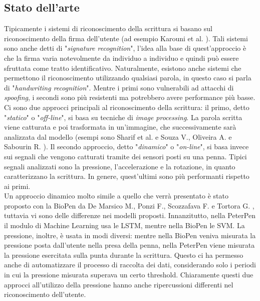 \documentclass[8pt,notitlepage]{report}
\begin{document}
\subsection*{Stato dell'arte}
	Tipicamente i sistemi di riconoscimento della scrittura si basano sul riconoscimento della firma dell'utente (ad esempio Karouni et al. \cite{Karouni15}). Tali sistemi sono anche detti di "\textit{signature recognition}", l'idea alla base di quest'approccio è che la firma varia notevolmente da individuo a individuo e quindi può essere sfruttata come tratto identificativo. Naturalmente, esistono anche sistemi che permettono il riconoscimento utilizzando qualsiasi parola, in questo caso si parla di "\textit{handwriting recognition}". Mentre i primi sono vulnerabili ad attacchi di \textit{spoofing}, i secondi sono più resistenti ma potrebbero avere performance più basse. \\
	Ci sono due approcci principali al riconoscimento della scrittura: il primo, detto "\textit{statico}" o "\textit{off-line}", si basa su tecniche di \textit{image processing}. La parola scritta viene catturata e poi trasformata in un'immagine, che successivamente sarà analizzata dal modello (esempi sono Sharif et al.\cite{Sharif18} e Souza V., Oliveira A. e Sabourin R. \cite{Souza18}). Il secondo approccio, detto "\textit{dinamico}" o "\textit{on-line}", si basa invece sui segnali che vengono catturati tramite dei sensori posti su una penna. Tipici segnali analizzati sono la pressione, l'accelerazione e la rotazione, in quanto caratterizzano la scrittura. In genere, quest'ultimi sono più performanti rispetto ai primi. \\
	Un approccio dinamico molto simile a quello che verrà presentato è stato proposto con la BioPen da De Marsico M., Ponzi F., Scozzafava F. e Tortora G. \cite{DeMarsico18}, tuttavia vi sono delle differenze nei modelli proposti. Innanzitutto, nella PeterPen il modulo di Machine Learning usa le LSTM, mentre nella BioPen le SVM. La pressione, inoltre, è usata in modi diversi: mentre nella BioPen veniva misurata la pressione posta dall'utente nella presa della penna, nella PeterPen viene misurata la pressione esercitata sulla punta durante la scrittura. Questo ci ha permesso anche di automatizzare il processo di raccolta dei dati, considerando solo i periodi in cui la pressione misurata superava un certo threshold. Chiaramente questi due approcci all'utilizzo della pressione hanno anche ripercussioni differenti nel riconoscimento dell'utente. 

	
\end{document}
